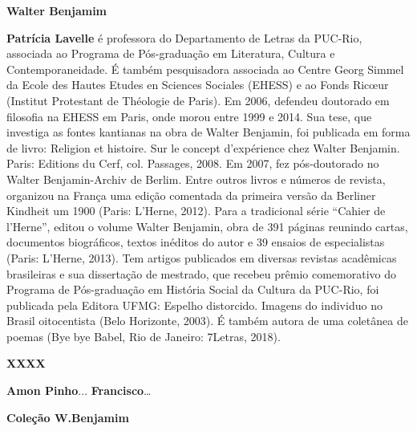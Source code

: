 
\textbf{Walter Benjamim} \lipsum[1]


\textbf{\titulo} \lipsum[2]

\textbf{Patrícia Lavelle} é professora do Departamento de Letras da PUC-Rio, associada ao Programa de Pós-graduação em Literatura, Cultura e Contemporaneidade. É também pesquisadora associada ao Centre Georg Simmel da Ecole des Hautes Etudes en Sciences Sociales (EHESS) e ao Fonds Ricœur (Institut Protestant de Théologie de Paris).
Em 2006, defendeu doutorado em filosofia na EHESS em Paris, onde morou entre 1999 e 2014. Sua tese, que investiga as fontes kantianas na obra de Walter Benjamin, foi publicada em forma de livro: Religion et histoire. Sur le concept d’expérience chez Walter Benjamin. Paris: Editions du Cerf, col. Passages, 2008. Em 2007, fez pós-doutorado no Walter Benjamin-Archiv de Berlim. Entre outros livros e números de revista, organizou na França uma edição comentada da primeira versão da Berliner Kindheit um 1900 (Paris: L’Herne, 2012). Para a tradicional série “Cahier de l’Herne”, editou o volume Walter Benjamin, obra de 391 páginas reunindo cartas, documentos biográficos, textos inéditos do autor e 39 ensaios de especialistas (Paris: L’Herne, 2013).
Tem artigos publicados em diversas revistas acadêmicas brasileiras e sua dissertação de mestrado, que recebeu prêmio comemorativo do Programa de Pós-graduação em História Social da Cultura da PUC-Rio, foi publicada pela Editora UFMG: Espelho distorcido. Imagens do individuo no Brasil oitocentista (Belo Horizonte, 2003). É também autora de uma coletânea de poemas (Bye bye Babel, Rio de Janeiro: 7Letras, 2018). 

\textbf{XXXX} \lipsum[4]

\textbf{Amon Pinho}...
\textbf{Francisco}…

\textbf{Coleção W.Benjamim} \lipsum[6]


